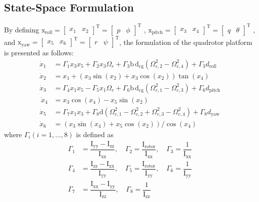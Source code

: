 \documentclass[3p]{elsarticle}
\begin{document}
\subsection{State-Space Formulation}\label{sec:state-space}
\noindent By defining $\boldsymbol{\mathrm{x}}_{\text{roll}} = \begin{bmatrix}
    x_1 & x_2
\end{bmatrix}^{\mathrm{T}}=
\begin{bmatrix}
    p & \phi
\end{bmatrix}^{\mathrm{T}}$
,
$\boldsymbol{\mathrm{x}}_{\text{pitch}} = \begin{bmatrix}
    x_3 & x_4 \end{bmatrix}^{\mathrm{T}} = 
    \begin{bmatrix}
    q & \theta \end{bmatrix}^{\mathrm{T}}
    $
    , and
    $\boldsymbol{\mathrm{x}}_{\text{yaw}} = 
    \begin{bmatrix}
        x_5 & x_6
    \end{bmatrix}^{\mathrm{T}} = 
    \begin{bmatrix}
        r & \psi
    \end{bmatrix}^{\mathrm{T}}$, the formulation of the quadrotor platform is presented as follows:
\begin{align}\label{eq:diffeq}
    \dot x_1 &= \Gamma_1x_3 x_5 + \Gamma_2 x_3 \Omega_r + \Gamma_3\mathrm{b\,d}_{\text{cg}} (\Omega_{c, 2}^2 - \Omega_{c, 4}^2) + \Gamma_3d_{\text{roll}} \\[0.5em]
    \dot x_2 &= x_1 + (x_3\sin(x_2) + x_3\cos(x_2))\tan(x_4)
    \\[0.5em]
    \dot x_3 &= \Gamma_4 x_1 x_5 - \Gamma_5 x_1 \Omega_r +  \Gamma_6\mathrm{b\,d}_{\text{cg}} (\Omega_{c, 1}^2 - \Omega_{c, 3}^2) + \Gamma_6d_{\text{pitch}}\\[0.5em]~\label{eq:diffeq-mid}
    \dot x_4 &= x_3\cos(x_4) - x_5\sin(x_2)\\[0.5em]
    \dot x_5 &= \Gamma_7x_1 x_3 +  \Gamma_8\mathrm{d} (\Omega_{c, 1}^2 - \Omega_{c, 2}^2 + \Omega_{c, 3}^2 - \Omega_{c, 4}^2) + \Gamma_8d_{\text{yaw}}\\[0.5em] 
    \dot x_6 &= (x_3\sin(x_4) + x_5\cos(x_2))/\cos(x_4)~\label{eq:diffeq-end}
\end{align}
where $\Gamma_i (i = 1, \ldots, 8)$ is defined as
\begin{equation}
    \begin{split}
        \Gamma_1 &= \dfrac{\mathrm{I}_{\text{yy}} - \mathrm{I}_{\text{zz}}}{\mathrm{I}_{\text{xx}}}, \quad \Gamma_2 = \dfrac{\mathrm{I}_{\text{rotor}}}{\mathrm{I}_{\text{xx}}}, \quad \Gamma_3 = \dfrac{1}{\mathrm{I}_{\text{xx}}}\\ \Gamma_4 &= \dfrac{\mathrm{I}_{\text{zz}} - \mathrm{I}_{\text{xx}}}{\mathrm{I}_{\text{yy}}}, \quad \Gamma_5 = \dfrac{\mathrm{I}_{\text{rotor}}}{\mathrm{I}_{\text{yy}}}, \quad \Gamma_6 = \dfrac{1}{\mathrm{I}_{\text{yy}}} \\ \Gamma_7 &= \dfrac{\mathrm{I}_{\text{xx}} - \mathrm{I}_{\text{yy}}}{\mathrm{I}_{\text{zz}}}, \quad \Gamma_8 = \dfrac{1}{\mathrm{I}_{\text{zz}}}
    \end{split}
\end{equation}
\end{document}
